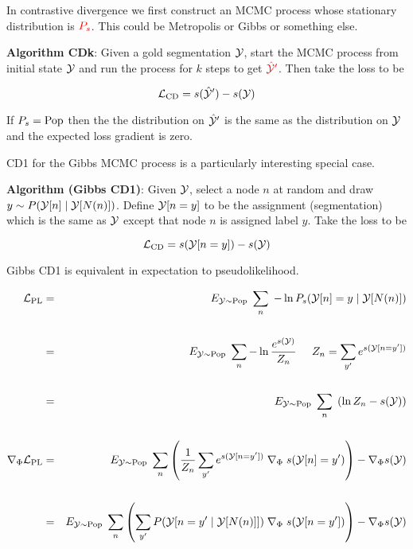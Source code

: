 {

In contrastive divergence we first construct an MCMC process whose stationary distribution is ${\color{red} P_s}$.  This could be
Metropolis or Gibbs or something else.

\vfill
{\bf Algorithm CDk}: Given a gold segmentation ${\cal Y}$, start the MCMC process from initial state ${\cal Y}$ and run the process for $k$ steps
to get ${\color{red} \hat{\cal Y}'}$.  Then take the loss to be

\vfill
{\color{red} $${\cal L}_{\mathrm{CD}}  = s(\hat{\cal Y}') - s({\cal Y})$$}

If $P_s = \mathrm{Pop}$ then the the distribution on $\hat{\cal Y}'$ is the same as the distribution on ${\cal Y}$ and the
expected loss gradient is zero.


CD1 for the Gibbs MCMC process is a particularly interesting special case.

\vfill
{\bf Algorithm (Gibbs CD1)}: Given ${\cal Y}$, select a node $n$ at random and draw {\color{red} $y \sim P({\cal Y}[n]\;| \;{\cal Y}[N(n)])$}. Define {\color{red} ${\cal Y}[n=y]$}
to be the assignment (segmentation) which is the same as ${\cal Y}$ except that node $n$ is assigned label $y$.  Take the loss to be

\vfill
{\color{red} $${\cal L}_{\mathrm{CD}}  = s({\cal Y}[n=y]) - s({\cal Y})$$}


Gibbs CD1 is equivalent in expectation to pseudolikelihood.

{\huge
\begin{eqnarray*}
{\cal L}_{\mathrm{PL}} & = & E_{{\cal Y} \sim \mathrm{Pop}}\;\sum_n \; - \ln P_s({\cal Y}[n]=y\;|\;{\cal Y}[N(n)]) \\
\\
 & = & E_{{\cal Y} \sim \mathrm{Pop}}\;\sum_n -\ln \frac{e^{s({\cal Y})}}{Z_n}\;\;\;\;\;{Z_n = \sum_{y'} e^{s({\cal Y}[n=y'])}} \\
\\
& = & E_{{\cal Y} \sim \mathrm{Pop}}\;\sum_n\; \left(\ln Z_n - s({\cal Y})\right) \\
\\
\nabla_\Phi {\cal L}_{\mathrm{PL}} & = & E_{{\cal Y} \sim \mathrm{Pop}}\;\sum_n \left(\frac{1}{Z_n} \sum_{y'} e^{s({\cal Y}[n=y'])} \; \nabla_\Phi\;s({\cal Y}[n]=y')\right) - \nabla_\Phi s({\cal Y}) \\
\\
& = & E_{{\cal Y} \sim \mathrm{Pop}}\;\sum_n \left(\sum_{y'} P({\cal Y}[n=y'\;|\;{\cal Y}[N(n)]]) \; \nabla_\Phi\;s({\cal Y}[n=y'])\right) - \nabla_\Phi s({\cal Y})
\end{eqnarray*}
}

}
